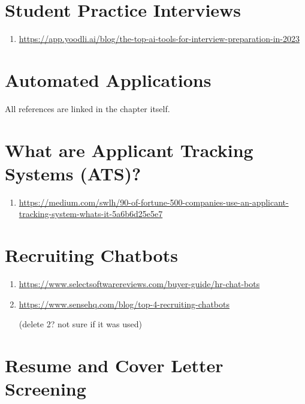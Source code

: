 \documentclass[
]{book}
\providecommand{\tightlist}{%
  \setlength{\itemsep}{0pt}\setlength{\parskip}{0pt}}
\begin{document}
\hypertarget{student-practice-interviews-1}{%
\section{Student Practice Interviews}\label{student-practice-interviews-1}}

\begin{enumerate}
\def\labelenumi{\arabic{enumi}.}
\tightlist
\item
  \url{https://app.yoodli.ai/blog/the-top-ai-tools-for-interview-preparation-in-2023}
\end{enumerate}

\hypertarget{automated-applications-1}{%
\section{Automated Applications}\label{automated-applications-1}}

All references are linked in the chapter itself.

\hypertarget{what-are-applicant-tracking-systems-ats-1}{%
\section{What are Applicant Tracking Systems (ATS)?}\label{what-are-applicant-tracking-systems-ats-1}}

\begin{enumerate}
\def\labelenumi{\arabic{enumi}.}
\tightlist
\item
  \url{https://medium.com/swlh/90-of-fortune-500-companies-use-an-applicant-tracking-system-whats-it-5a6b6d25e5e7}
\end{enumerate}

\hypertarget{recruiting-chatbots-1}{%
\section{Recruiting Chatbots}\label{recruiting-chatbots-1}}

\begin{enumerate}
\def\labelenumi{\arabic{enumi}.}
\item
  \url{https://www.selectsoftwarereviews.com/buyer-guide/hr-chat-bots}
\item
  \url{https://www.sensehq.com/blog/top-4-recruiting-chatbots}

  (delete 2? not sure if it was used)
\end{enumerate}

\hypertarget{resume-and-cover-letter-screening-1}{%
\section{Resume and Cover Letter Screening}\label{resume-and-cover-letter-screening-1}}
\end{document}

